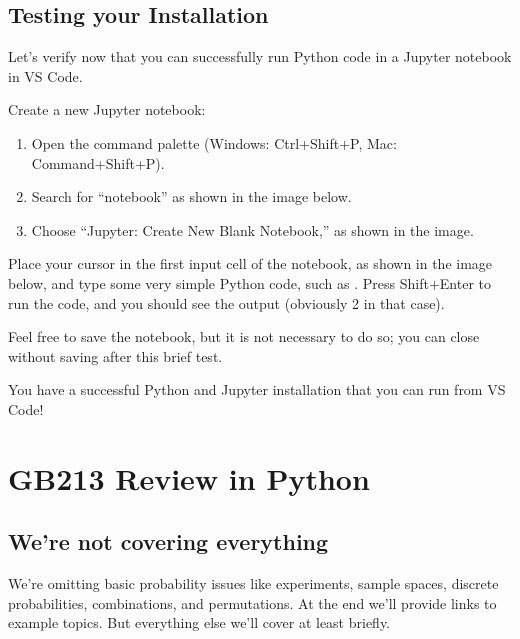 \documentclass[letterpaper,10pt,english]{jupyterBook}
\begin{document}
\section{Testing your Installation}
\label{\detokenize{vs-code-installation:testing-your-installation}}
\sphinxAtStartPar
Let’s verify now that you can successfully run Python code in a Jupyter notebook
in VS Code.

\sphinxAtStartPar
Create a new Jupyter notebook:
\begin{enumerate}
%
\item {} 
\sphinxAtStartPar
Open the command palette (Windows: Ctrl+Shift+P, Mac: Command+Shift+P).

\item {} 
\sphinxAtStartPar
Search for “notebook” as shown in the image below.

\item {} 
\sphinxAtStartPar
Choose “Jupyter: Create New Blank Notebook,” as shown in the image.

\end{enumerate}



\sphinxAtStartPar
Place your cursor in the first input cell of the notebook, as shown in the image
below, and type some very simple Python code, such as .  Press Shift+Enter
to run the code, and you should see the output (obviously 2 in that case).



\sphinxAtStartPar
Feel free to save the notebook, but it is not necessary to do so; you can close
without saving after this brief test.

\sphinxAtStartPar
You have a successful Python and Jupyter installation that you can run from VS Code!


\chapter{GB213 Review in Python}
\label{\detokenize{GB213-review-in-Python:gb213-review-in-python}}\label{\detokenize{GB213-review-in-Python::doc}}

\section{We’re not covering everything}
\label{\detokenize{GB213-review-in-Python:we-re-not-covering-everything}}
\sphinxAtStartPar
We’re omitting basic probability issues like experiments, sample spaces, discrete probabilities, combinations, and permutations.  At the end we’ll provide links to example topics.  But everything else we’ll cover at least briefly.
\end{document}
